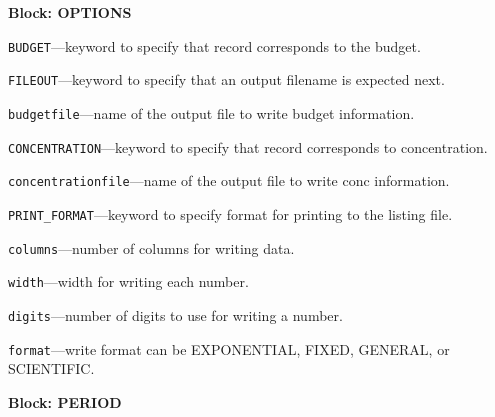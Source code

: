 
\item \textbf{Block: OPTIONS}

\begin{description}
\item \texttt{BUDGET}---keyword to specify that record corresponds to the budget.

\item \texttt{FILEOUT}---keyword to specify that an output filename is expected next.

\item \texttt{budgetfile}---name of the output file to write budget information.

\item \texttt{CONCENTRATION}---keyword to specify that record corresponds to concentration.

\item \texttt{concentrationfile}---name of the output file to write conc information.

\item \texttt{PRINT\_FORMAT}---keyword to specify format for printing to the listing file.

\item \texttt{columns}---number of columns for writing data.

\item \texttt{width}---width for writing each number.

\item \texttt{digits}---number of digits to use for writing a number.

\item \texttt{format}---write format can be EXPONENTIAL, FIXED, GENERAL, or SCIENTIFIC.

\end{description}
\item \textbf{Block: PERIOD}

